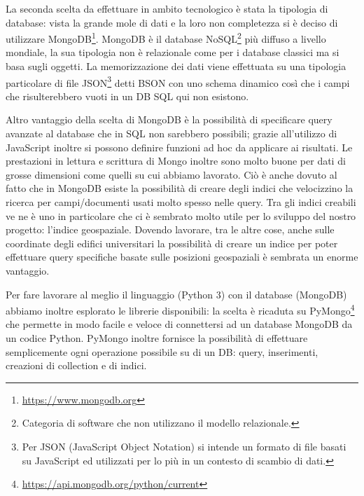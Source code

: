 \documentclass[12pt]{report}
\begin{document}
\vspace{5mm} %

La seconda scelta da effettuare in ambito tecnologico è stata la tipologia di database: vista la grande mole di dati e la loro non completezza si è deciso di utilizzare MongoDB\footnote{\url{https://www.mongodb.org}}. MongoDB è il database NoSQL\footnote{Categoria di software che non utilizzano il modello relazionale.} più diffuso a livello mondiale, la sua tipologia non è relazionale come per i database classici ma si basa sugli oggetti. La memorizzazione dei dati viene effettuata su una tipologia particolare di file JSON\footnote{Per JSON (JavaScript Object Notation) si intende un formato di file basati su JavaScript ed utilizzati per lo più in un contesto di scambio di dati.} detti BSON con uno schema dinamico così che i campi che risulterebbero vuoti in un DB SQL qui non esistono. 

Altro vantaggio della scelta di MongoDB è la possibilità di specificare query avanzate al database che in SQL non sarebbero possibili; 
grazie all'utilizzo di JavaScript inoltre si possono definire funzioni ad hoc da applicare ai risultati. Le prestazioni in lettura e scrittura di Mongo inoltre sono molto buone per dati di grosse dimensioni come quelli su cui abbiamo lavorato. Ciò è anche dovuto al fatto che in MongoDB 
esiste la possibilità di creare degli indici che velocizzino la ricerca per campi/documenti usati molto spesso nelle query. Tra gli indici creabili ve ne è uno in particolare che ci è sembrato molto utile per lo sviluppo del nostro progetto: l'indice geospaziale. Dovendo lavorare, tra le altre cose, anche sulle coordinate degli edifici universitari la possibilità di creare un indice per poter effettuare query specifiche basate sulle posizioni geospaziali è sembrata un enorme vantaggio.

Per fare lavorare al meglio il linguaggio (Python 3) con il database (MongoDB) abbiamo inoltre esplorato le librerie disponibili: la scelta è ricaduta su PyMongo\footnote{\url{https://api.mongodb.org/python/current}} che permette in modo facile e veloce di connettersi ad un database MongoDB da un codice Python. PyMongo inoltre fornisce la possibilità di effettuare semplicemente ogni operazione possibile su di un DB: query, inserimenti, creazioni di collection e di indici. %
\end{document}
